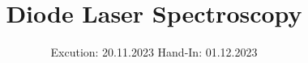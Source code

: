 

\subject{V60}
\title{Diode Laser Spectroscopy}
\date{%
  Excution: 20.11.2023
  \hspace{3em}
  Hand-In: 01.12.2023
}



\maketitle
\thispagestyle{empty}
\tableofcontents
\newpage
\setcounter{page}{1}







\printbibliography{}



